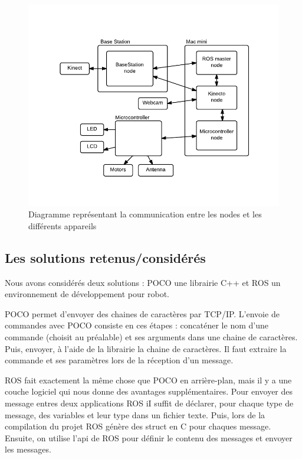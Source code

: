 \begin{figure}[htbp]
\centering
\includegraphics[scale=1]{fig/communicationNodesAppareils.pdf}
\caption{Diagramme représentant la communication entre les nodes et les différents appareils}
\label{fig:commNodes}
\end{figure}

\subsection{Les solutions retenus/considérés}
Nous avons considérés deux solutions : POCO une librairie C++ et ROS un environnement de développement pour robot.

POCO permet d’envoyer des chaines de caractères par TCP/IP. L’envoie de commandes avec POCO consiste en ces étapes : concaténer le nom d’une commande (choisit au préalable) et ses arguments dans une chaine de caractères. Puis, envoyer, à l’aide de la librairie la chaine de caractères. Il faut extraire la commande et ses paramètres lors de la réception d’un message.

ROS fait exactement la même chose que POCO en arrière-plan, mais  il y a une couche logiciel qui nous donne des avantages supplémentaires. Pour envoyer des message entres deux applications ROS iI suffit de déclarer, pour chaque type de message, des variables et leur type dans un fichier texte. Puis, lors de la compilation du projet ROS génère des struct en C pour chaques message. Ensuite, on utilise l’api de ROS pour définir le contenu des messages et envoyer les messages.


